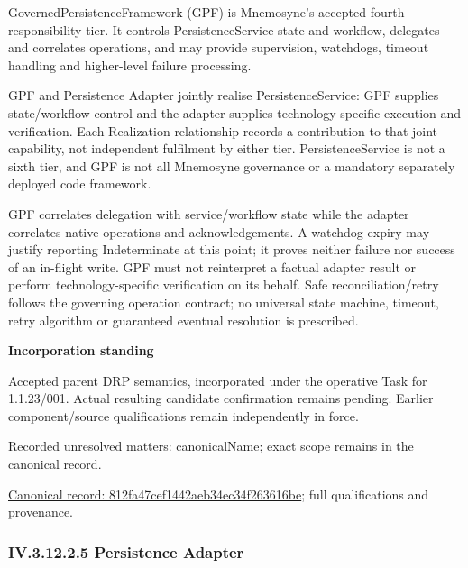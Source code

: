 GovernedPersistenceFramework (GPF) is Mnemosyne's accepted fourth responsibility tier. It controls PersistenceService state and workflow, delegates and correlates operations, and may provide supervision, watchdogs, timeout handling and higher-level failure processing.



GPF and Persistence Adapter jointly realise PersistenceService: GPF supplies state/workflow control and the adapter supplies technology-specific execution and verification. Each Realization relationship records a contribution to that joint capability, not independent fulfilment by either tier. PersistenceService is not a sixth tier, and GPF is not all Mnemosyne governance or a mandatory separately deployed code framework.



GPF correlates delegation with service/workflow state while the adapter correlates native operations and acknowledgements. A watchdog expiry may justify reporting Indeterminate at this point; it proves neither failure nor success of an in-flight write. GPF must not reinterpret a factual adapter result or perform technology-specific verification on its behalf. Safe reconciliation/retry follows the governing operation contract; no universal state machine, timeout, retry algorithm or guaranteed eventual resolution is prescribed.



\par\medskip\textbf{Incorporation standing}\par


Accepted parent DRP semantics, incorporated under the operative Task for 1.1.23/001. Actual resulting candidate confirmation remains pending. Earlier component/source qualifications remain independently in force.


{\small Recorded unresolved matters: canonicalName; exact scope remains in the canonical record.}\par
{\footnotesize \href{../../../../../../../continuum/application/application-function/812fa47cef1442aeb34ec34f263616be.md}{Canonical record: 812fa47cef1442aeb34ec34f263616be}; full qualifications and provenance.}\par
\subsubsection*{IV.3.12.2.5 Persistence Adapter}
\label{navigation:IV.3.12.2.5}

